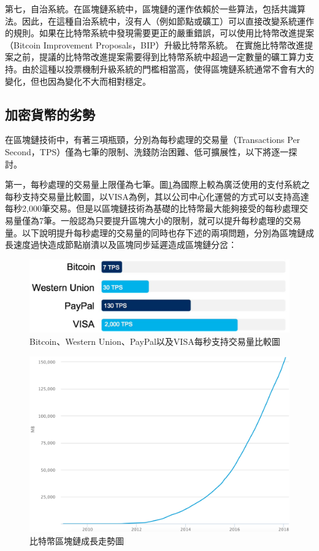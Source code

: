 				第七，自治系統。在區塊鏈系統中，區塊鏈的運作依賴於一些算法，包括共識算法。因此，在這種自治系統中，沒有人（例如節點或礦工）可以直接改變系統運作的規則。如果在比特幣系統中發現需要更正的嚴重錯誤，可以使用比特幣改進提案（Bitcoin Improvement Proposals，BIP）\supercite{BitcoinImprovementProposals}升級比特幣系統。 在實施比特幣改進提案之前，提議的比特幣改進提案需要得到比特幣系統中超過一定數量的礦工算力支持。由於這種以投票機制升級系統的門檻相當高，使得區塊鏈系統通常不會有大的變化，但也因為變化不大而相對穩定。

			\subsection{加密貨幣的劣勢}
			在區塊鏈技術中，有著三項瓶頸，分別為每秒處理的交易量（Transactions Per Second，TPS）僅為七筆的限制、洗錢防治困難、低可擴展性，以下將逐一探討。

				第一，每秒處理的交易量上限僅為七筆。圖\ref{TPS}為國際上較為廣泛使用的⽀付系統之每秒⽀持交易量⽐較圖，以VISA為例，其以公司中心化運營的方式可以支持高達每秒2,000筆交易。但是以區塊鏈技術為基礎的比特幣最大能夠接受的每秒處理交易量僅為7筆。一般認為只要提升區塊大小的限制，就可以提升每秒處理的交易量。以下說明提升每秒處理的交易量的同時也存下述的兩項問題，分別為區塊鏈成長速度過快造成節點崩潰以及區塊同步延遲造成區塊鏈分岔：

					\begin{figure}[!htbp]
						\centering
						\includegraphics[width = .6\textwidth]{TPS.png}
						\caption{Bitcoin、Western Union\supercite{WesternUnion}、PayPal\supercite{PayPal}以及VISA每秒支持交易量比較圖\supercite{digibyte}}\label{TPS}
					\end{figure}

					\begin{figure}[!htbp]
						\centering
						\includegraphics[width = .8\textwidth]{blockchainsize.png}
						\caption{比特幣區塊鏈成長走勢圖\supercite{blockchainsize}}\label{blockchainsize}
					\end{figure}


